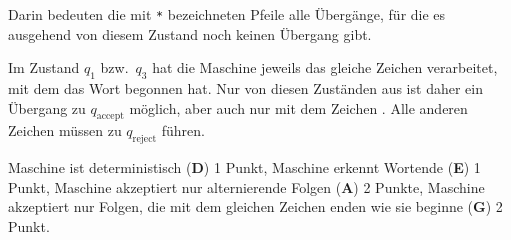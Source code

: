 \begin{loesung}
\begin{center}
\end{center}
Darin bedeuten die mit \texttt{*} bezeichneten Pfeile alle Übergänge, für die
es ausgehend von diesem Zustand noch keinen Übergang gibt.

Im Zustand $q_1$ bzw.~$q_3$ hat die Maschine jeweils das gleiche Zeichen
verarbeitet, mit dem das Wort begonnen hat.
Nur von diesen Zuständen aus ist daher ein Übergang zu $q_{\text{accept}}$
möglich, aber auch nur mit dem Zeichen \blank.
Alle anderen Zeichen müssen zu $q_{\text{reject}}$ führen.
\end{loesung}

\begin{bewertung}
Maschine ist deterministisch ({\bf D}) 1 Punkt,
Maschine erkennt Wortende ({\bf E}) 1 Punkt,
Maschine akzeptiert nur alternierende Folgen ({\bf A}) 2 Punkte,
Maschine akzeptiert nur Folgen, die mit dem gleichen Zeichen enden wie
sie beginne ({\bf G}) 2 Punkt.
\end{bewertung}



